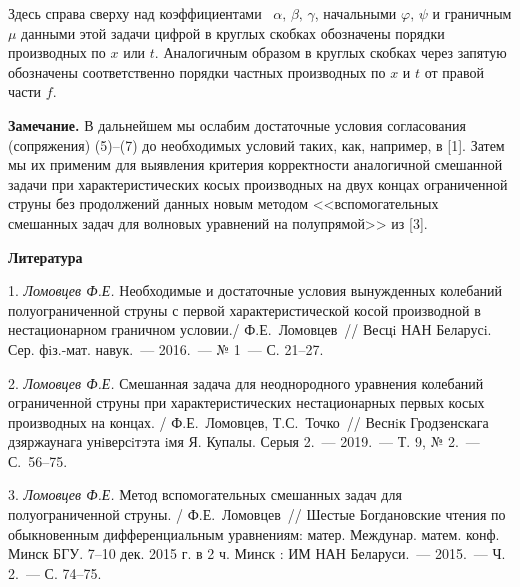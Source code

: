  Здесь справа сверху над коэффициентами ~$\alpha,\, \beta,\, \gamma$, начальными $\varphi,\,\psi$
и граничным $\mu$ данными этой задачи цифрой в круглых скобках
обозначены порядки производных по $x$ или $t$. Аналогичным образом
в круглых скобках через запятую обозначены соответственно порядки
частных производных по $x$ и $t$ от правой части $f$.

{\bf Замечание.} В дальнейшем мы ослабим достаточные условия
согласования (сопряжения) (5)--(7) до необходимых условий таких,
как, например, в [1]. Затем мы их применим для выявления критерия
корректности аналогичной смешанной задачи при характеристических
косых производных на двух концах ограниченной струны без
продолжений данных новым методом <<вспомогательных смешанных задач
для волновых уравнений на полупрямой>> из [3].

\smallskip \centerline{\bf Литература}\nopagebreak

1. \textit{Ломовцев Ф.Е.} {Необходимые и достаточные условия
вынужденных колебаний полуограниченной струны с первой
характеристической косой производной в нестационарном граничном
условии./ Ф.Е.~Ломовцев~// Весцi НАН Беларусi. Сер. фiз.-мат.
навук.~--- 2016.~--- № 1~--- С. 21--27.}


2. \textit{Ломовцев Ф.Е.} {Смешанная задача для неоднородного
уравнения колебаний ограниченной струны при характеристических
нестационарных первых косых производных на концах. /
Ф.Е.~Ломовцев, Т.С.~Точко~// Веснiк Гродзенскага дзяржаунага
унiверсiтэта iмя Я. Купалы. Серыя 2.~--- 2019.~--- Т. 9, № 2.~---
С.~56--75.}


3. \textit{Ломовцев Ф.Е.} {Метод вспомогательных смешанных задач
для полуограниченной струны. / Ф.Е.~Ломовцев~// Шестые
Богдановские чтения по обыкновенным дифференциальным уравнениям:
матер. Междунар. матем. конф. Минск БГУ. 7--10 дек. 2015 г. в 2 ч.
Минск : ИМ НАН Беларуси.~--- 2015.~--- Ч. 2.~--- С. 74--75.}
